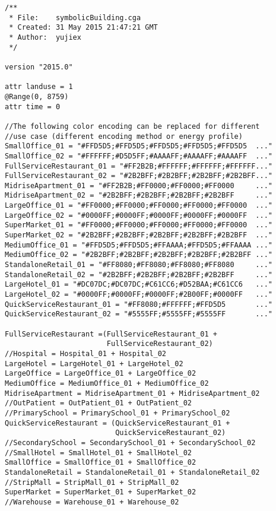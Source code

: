 \begin{multicols}{2}
\begin{verbatim}
/**
 * File:    symbolicBuilding.cga
 * Created: 31 May 2015 21:47:21 GMT
 * Author:  yujiex
 */

version "2015.0"

attr landuse = 1
@Range(0, 8759)
attr time = 0

//The following color encoding can be replaced for different
//use case (different encoding method or energy profile)
SmallOffice_01 = "#FFD5D5;#FFD5D5;#FFD5D5;#FFD5D5;#FFD5D5  ..."
SmallOffice_02 = "#FFFFFF;#D5D5FF;#AAAAFF;#AAAAFF;#AAAAFF  ..."
FullServiceRestaurant_01 = "#FF2B2B;#FFFFFF;#FFFFFF;#FFFFFF..."
FullServiceRestaurant_02 = "#2B2BFF;#2B2BFF;#2B2BFF;#2B2BFF..."
MidriseApartment_01 = "#FF2B2B;#FF0000;#FF0000;#FF0000     ..."
MidriseApartment_02 = "#2B2BFF;#2B2BFF;#2B2BFF;#2B2BFF     ..."
LargeOffice_01 = "#FF0000;#FF0000;#FF0000;#FF0000;#FF0000  ..."
LargeOffice_02 = "#0000FF;#0000FF;#0000FF;#0000FF;#0000FF  ..."
SuperMarket_01 = "#FF0000;#FF0000;#FF0000;#FF0000;#FF0000  ..."
SuperMarket_02 = "#2B2BFF;#2B2BFF;#2B2BFF;#2B2BFF;#2B2BFF  ..."
MediumOffice_01 = "#FFD5D5;#FFD5D5;#FFAAAA;#FFD5D5;#FFAAAA ..."
MediumOffice_02 = "#2B2BFF;#2B2BFF;#2B2BFF;#2B2BFF;#2B2BFF ..."
StandaloneRetail_01 = "#FF8080;#FF8080;#FF8080;#FF8080     ..."
StandaloneRetail_02 = "#2B2BFF;#2B2BFF;#2B2BFF;#2B2BFF     ..."
LargeHotel_01 = "#DC07DC;#DC07DC;#C61CC6;#D52BAA;#C61CC6   ..."
LargeHotel_02 = "#0000FF;#0000FF;#0000FF;#2B00FF;#0000FF   ..."
QuickServiceRestaurant_01 = "#FF8080;#FFFFFF;#FFD5D5       ..."
QuickServiceRestaurant_02 = "#5555FF;#5555FF;#5555FF       ..."

FullServiceRestaurant =(FullServiceRestaurant_01 + 
                        FullServiceRestaurant_02)
//Hospital = Hospital_01 + Hospital_02
LargeHotel = LargeHotel_01 + LargeHotel_02
LargeOffice = LargeOffice_01 + LargeOffice_02
MediumOffice = MediumOffice_01 + MediumOffice_02
MidriseApartment = MidriseApartment_01 + MidriseApartment_02
//OutPatient = OutPatient_01 + OutPatient_02
//PrimarySchool = PrimarySchool_01 + PrimarySchool_02
QuickServiceRestaurant = (QuickServiceRestaurant_01 + 
                          QuickServiceRestaurant_02)
//SecondarySchool = SecondarySchool_01 + SecondarySchool_02
//SmallHotel = SmallHotel_01 + SmallHotel_02
SmallOffice = SmallOffice_01 + SmallOffice_02
StandaloneRetail = StandaloneRetail_01 + StandaloneRetail_02
//StripMall = StripMall_01 + StripMall_02
SuperMarket = SuperMarket_01 + SuperMarket_02
//Warehouse = Warehouse_01 + Warehouse_02


\end{verbatim}
\end{multicols}
